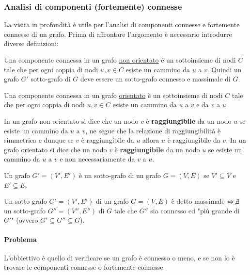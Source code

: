         \subsubsection{Analisi di componenti (fortemente) connesse}
            La visita in profondità è utile per l'analisi di componenti connesse e fortemente connesse di un grafo. Prima di affrontare l'argomento è necessario introdurre diverse definizioni:
            \begin{definition}
                Una componente connessa in un grafo \underline{non orientato} è un sottoinsieme di nodi $C$ tale che per ogni coppia di nodi $u,v\in C$ esiste un cammino da $u$ a $v$. Quindi un grafo $G'$ sotto-grafo di $G$ deve essere un sotto-grafo connesso e massimale di $G$.
            \end{definition}
            \begin{definition}
                Una componente connessa in un grafo \underline{orientato} è un sottoinsieme di nodi $C$ tale che per ogni coppia di nodi $u,v\in C$ esiste un cammino da $u$ a $v$ e da $v$ a $u$.
            \end{definition}
            \begin{definition}[Raggiungibilità]
                In un grafo non orientato si dice che un nodo $v$ è \textbf{raggiungibile} da un nodo $u$ se esiste un cammino da $u$ a $v$, ne segue che la relazione di raggiungibilità è simmetrica e dunque se $v$ è raggiungibile da $u$ allora $u$ è raggiungibile da $v$.
                In un grafo orientato si dice che un nodo $v$ è \textbf{raggiungibile} da un nodo $u$ se esiste un cammino da $u$ a $v$ e non necessariamente da $v$ a $u$.
            \end{definition}
            \begin{definition}
                Un grafo $G'=(V',E')$ è un sotto-grafo di un grafo $G=(V,E)$ se $V'\subseteq V$ e $E'\subseteq E$.
            \end{definition}
            \begin{definition}
                Un sotto-grafo $G'=(V',E')$ di un grafo $G=(V,E)$ è detto massimale $\Leftrightarrow \not\exists$ un sotto-grafo $G''=(V'',E'')$ di $G$ tale che $G''$ sia connesso ed "più grande di $G'$" (ovvero $G'\subseteq G''\subseteq G$).
            \end{definition}
            \paragraph{Problema} L'obbiettivo è quello di verificare se un grafo è connesso o meno, e se non lo è trovare le componenti connesse o fortemente connesse.
